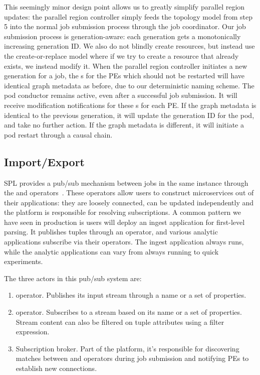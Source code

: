 This seemingly minor design point allows us to greatly simplify parallel region
updates: the parallel region controller simply feeds the topology model from
step 5 into the normal job submission process through the job coordinator.  Our
job submission process is generation-aware: each generation gets a
monotonically increasing generation ID. We also do not blindly create
resources, but instead use the create-or-replace model where if we try to
create a resource that already exists, we instead modify it.  When the parallel
region controller initiates a new generation for a job, the s
for the PEs which should not be restarted will have identical graph metadata as
before, due to our deterministic naming scheme.  The pod conductor remains
active, even after a successful job submission. It will receive modification
notifications for these s for each PE.  If the graph metadata
is identical to the previous generation, it will update the generation ID for
the pod, and take no further action. If the graph metadata is different, it
will initiate a pod restart through a causal chain.

\subsection{Import/Export}

SPL provides a pub/sub mechanism between jobs in the same instance through the
 and  operators~\cite{spl_import, spl_export}. These
operators allow users to construct microservices out of their applications: they
are loosely connected, can be updated independently and the platform is
responsible for resolving subscriptions. A common pattern we have seen in
production is users will deploy an ingest application for first-level parsing.
It publishes tuples through an  operator, and various analytic
applications subscribe via their  operators. The ingest application
always runs, while the analytic applications can vary from always running
to quick experiments.
 
The three actors in this pub/sub system are:
\begin{enumerate}
    \item {} operator. Publishes its input stream through a name 
        or a set of properties.
    \item {} operator. Subscribes to a stream based on its name or 
        a set of properties. Stream content can also be filtered on tuple 
        attributes using a filter expression.
    \item Subscription broker. Part of the platform, it's responsible for discovering 
        matches between  and  operators during job 
        submission and notifying PEs to establish new connections.
\end{enumerate}

